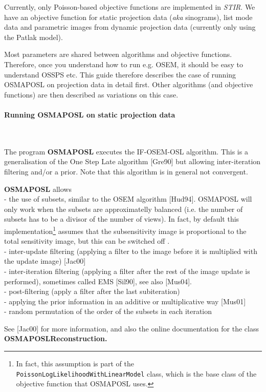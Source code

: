 \documentclass{article}
\newcommand{\tab}{\hspace{5mm}}
\newcommand{\subsubsubsection}[1]{\paragraph{#1}\mbox{} \\}
\begin{document}
Currently, only Poisson-based objective functions are implemented in \textit{STIR}. We
have an objective function for static projection data (\textit{aka} sinograms),
list mode data and parametric images from dynamic projection data 
(currently only using the Patlak model).

Most parameters are shared between algorithms and objective functions. Therefore,
once you understand how to run e.g. OSEM, it should be easy to understand OSSPS etc.
This guide therefore describes the case of running OSMAPOSL on projection data in detail
first. Other algorithms (and objective functions) are then described as variations on this
case.

{ \subsubsubsection{Running OSMAPOSL on static projection data}
}
\label{sec:OSMAPOSL}

The program \textbf{OSMAPOSL} executes the IF-OSEM-OSL algorithm. 
This is a generalisation of the One Step Late algorithm [Gre90] but allowing
inter-iteration filtering and/or a prior. Note that this 
algorithm is in general not convergent.

\textbf{OSMAPOSL} 
allows \\
-\tab 
the use of subsets, similar to the OSEM algorithm [Hud94]. OSMAPOSL
will only work when the subsets are approximatelly balanced (i.e.
the number of subsets has to be a divisor of the number of views).
In fact, by default this implementation\footnote{In fact, this assumption
is part of the \texttt{PoissonLogLikelihoodWithLinearModel} class, which is
the base class of the objective function that OSMAPOSL uses.} assumes that the 
subsensitivity image is proportional to the total sensitivity image,
but this can be switched off .\\
-\tab 
inter-update filtering (applying a filter to the image before 
it is multiplied with the update image) [Jac00]\\
-\tab 
inter-iteration filtering (applying a filter after the rest of 
the image update is performed), sometimes called EMS [Sil90], 
see also [Mus04].\\
-\tab 
post-filtering (apply a filter after the last subiteration)\\
-\tab 
applying the prior information in an additive or multiplicative 
way [Mus01]\\
-\tab 
random permutation of the order of the subsets in each iteration


See [Jac00] for more information, and also the online documentation 
for the class \textbf{OSMAPOSLReconstruction.}
\end{document}
